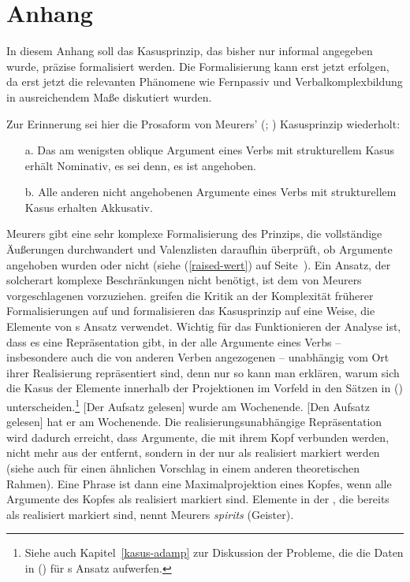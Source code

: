{\section{Anhang}
\label{kasus-anhang}
\label{sec-realized}

In diesem Anhang soll das Kasusprinzip, das bisher nur informal angegeben wurde,
präzise formalisiert werden. Die Formalisierung kann erst jetzt erfolgen, da erst jetzt die
relevanten Phänomene wie Fernpassiv und Verbalkomplexbildung in ausreichendem
Maße diskutiert wurden.

Zur Erinnerung sei hier die Prosaform von
Meurers' (\citeyear{Meurers99b}; \citeyear[Kapitel~10.4.1.4]{Meurers2000b})
Kasusprinzip wiederholt:

\begin{itemize}
\item[a.] Das am wenigsten oblique Argument eines Verbs mit strukturellem Kasus erhält Nominativ,
          es sei denn, es ist angehoben.
\item[b.] Alle anderen nicht angehobenen Argumente eines Verbs mit strukturellem Kasus erhalten Akkusativ.
\end{itemize}

\noindent
Meurers gibt eine sehr komplexe Formalisierung des Prinzips, die vollständige Äußerungen
durchwandert und Valenzlisten daraufhin überprüft, ob Argumente angehoben wurden oder nicht (siehe
(\ref{raised-wert}) auf Seite~\pageref{raised-wert}). Ein Ansatz, der solcherart komplexe Beschränkungen 
nicht benötigt, ist dem von Meurers vorgeschlagenen vorzuziehen. 
%
\citet[--57]{MdK2001a} greifen die Kritik an der Komplexität früherer Formalisierungen
auf und formalisieren das Kasusprinzip auf eine Weise, die Elemente von \prz{}s Ansatz \citeyearpar{Prze99}
verwendet. Wichtig für das Funktionieren der Analyse ist, dass es eine Repräsentation
gibt, in der alle Argumente eines Verbs -- insbesondere auch die von anderen Verben angezogenen -- unabhängig
vom Ort ihrer Realisierung repräsentiert sind, denn nur so kann man erklären,
warum sich die Kasus der Elemente innerhalb der Projektionen im Vorfeld in
den Sätzen in () unterscheiden.\footnote{
  Siehe auch Kapitel~\ref{kasus-adamp} zur Diskussion der Probleme, die die Daten in () für \prz{}s Ansatz aufwerfen.%
}
\eal
\label{bsp-der-aufsatz-gelesen-zwei}
\ex {}[Der Aufsatz gelesen] wurde am Wochenende.
\ex {}[Den Aufsatz gelesen] hat er am Wochenende.
\zl
Die realisierungsunabhängige Repräsentation wird dadurch erreicht, dass
Argumente, die mit ihrem Kopf verbunden werden, nicht mehr aus der \compsl entfernt,
sondern in der \compsl nur als realisiert markiert werden (siehe auch  
für einen ähnlichen Vorschlag in einem anderen theoretischen Rahmen). 
Eine Phrase ist dann eine Maximalprojektion eines Kopfes, wenn alle Argumente des Kopfes als realisiert markiert sind.
Elemente in der \compsl, die bereits als realisiert markiert sind, nennt Meurers \emph{spirits}
(Geister).

}
